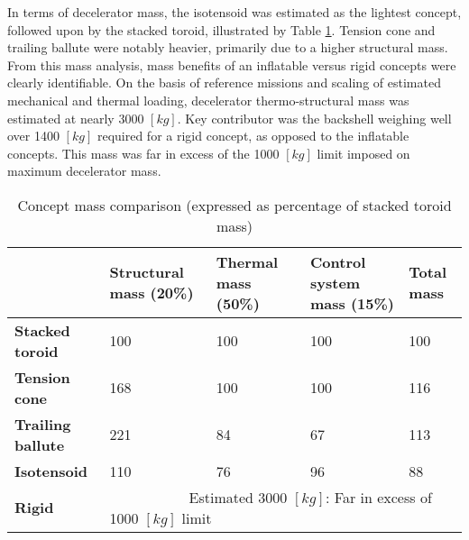 In terms of decelerator mass, the isotensoid was estimated as the lightest concept, followed upon by the stacked toroid, illustrated by Table \ref{tab:cmass}. Tension cone and trailing ballute were notably heavier, primarily due to a higher structural mass. From this mass analysis, mass benefits of an inflatable versus rigid concepts were clearly identifiable. On the basis of reference missions and scaling of estimated mechanical and thermal loading, decelerator thermo-structural mass was estimated at nearly 3000 $[kg]$. Key contributor was the backshell weighing well over 1400 $[kg]$ required for a rigid concept, as opposed to the inflatable concepts. This mass was far in excess of the 1000 $[kg]$ limit imposed on maximum decelerator mass.
\begin{table}[ht]
\centering
\caption[Concept mass comparison]{Concept mass comparison (expressed as percentage of stacked toroid mass)}\label{tab:cmass}
\begin{tabular}{|p{}|p{}|p{}|p{}||p{}|}

\hline
                          & \textbf{Structural mass (20\%)} & \textbf{Thermal mass (50\%)} & \textbf{Control system mass (15\%)} & \textbf{Total mass} \\ \hline
\textbf{Stacked toroid}   &  100                                 & 100                          & 100                                      &\cellcolor{green!70}  100                           \\ \hline
\textbf{Tension cone}     &  168                               & 100                               &  100                                     &\cellcolor{yellow!70} 116                                 \\ \hline
\textbf{Trailing ballute} &  221                                 & 84                               & 67                                      &\cellcolor{yellow!70} 113 \\ \hline
\textbf{Isotensoid}       &  110                                 & 76                               & 96                                      &\cellcolor{green!70} 88 \\ \hline \hline
\textbf{Rigid}            &  \multicolumn{4}{|p{0.762\textwidth}|}{\cellcolor{red!60} ~~~~~~~~~~~Estimated 3000 $[kg]$: Far in excess of 1000 $[kg]$ limit}    \\ \hline
\end{tabular}
\end{table}

